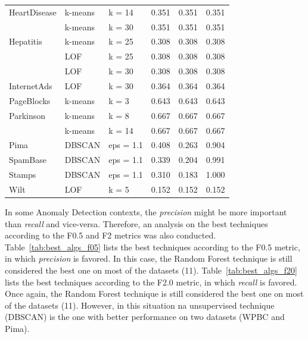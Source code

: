 \begin{table}[!ht]
\begin{tabular}{@{}llllll@{}}
		HeartDisease & k-means & k = 14 & 0.351 & 0.351 & 0.351 \\
		& k-means & k = 30 & 0.351 & 0.351 & 0.351 \\
		Hepatitis & k-means & k = 25 & 0.308 & 0.308 & 0.308 \\
		& LOF & k = 25 & 0.308 & 0.308 & 0.308 \\
		& LOF & k = 30 & 0.308 & 0.308 & 0.308 \\
		InternetAds & LOF & k = 30 & 0.364 & 0.364 & 0.364 \\
		PageBlocks & k-means & k = 3 & 0.643 & 0.643 & 0.643 \\
		Parkinson & k-means & k = 8 & 0.667 & 0.667 & 0.667 \\
		& k-means & k = 14 & 0.667 & 0.667 & 0.667 \\
		Pima & DBSCAN & eps = 1.1 & 0.408 & 0.263 & 0.904 \\
		SpamBase & DBSCAN & eps = 1.1 & 0.339 & 0.204 & 0.991 \\
		Stamps & DBSCAN & eps = 1.1 & 0.310 & 0.183 & 1.000 \\
		Wilt & LOF & k = 5 & 0.152 & 0.152 & 0.152 \\ \bottomrule
	\end{tabular}
\end{table}

In some Anomaly Detection contexts, the \textit{precision} might be more important than \textit{recall} and vice-versa.
Therefore, an analysis on the best techniques according to the F0.5 and F2 metrics was also conducted.
Table~\ref{tab:best_algs_f05} lists the best techniques according to the F0.5 metric, in which \textit{precision} is favored.
In this case, the Random Forest technique is still considered the best one on most of the datasets (11).
Table~\ref{tab:best_algs_f20} lists the best techniques according to the F2.0 metric, in which \textit{recall} is favored.
Once again, the Random Forest technique is still considered the best one on most of the datasets (11). However, in this situation na unsupervised technique (DBSCAN) is the one with better performance on two datasets (WPBC and Pima).

